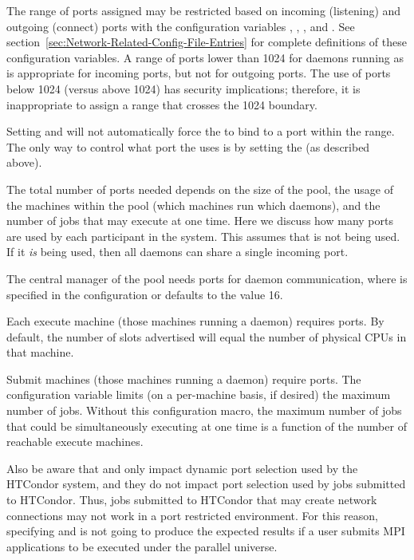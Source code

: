 The range of ports assigned may be restricted based on 
incoming (listening) and outgoing (connect) ports
with the configuration variables
,
,
, and
.
See section~\ref{sec:Network-Related-Config-File-Entries}
for complete definitions of these configuration variables.
A range of ports lower than 1024 for daemons
running as  is appropriate for incoming ports,
but not for outgoing ports.
The use of ports below 1024 (versus above 1024)
has security implications; 
therefore, it is inappropriate to assign a range that crosses
the 1024 boundary.


\Note Setting  and  will not
automatically force the  to bind to a port within
the range.
The only way to control what port the  uses is by
setting the  (as described above).

The total number of ports needed depends on the size of the pool,
the usage of the machines within the pool (which machines
run which daemons),
and the number of jobs that may execute at one time.
Here we discuss how many ports are used by each
participant in the system.  This assumes that 
is not being used.  If it \emph{is} being used, then all daemons
can share a single incoming port.

The central manager of the pool needs
ports for daemon communication,
where 
is specified in the
configuration or defaults to the value 16.

Each execute machine (those machines running a  daemon)
requires
ports.
By default, the number of slots advertised
will equal the number of physical CPUs in that machine.

Submit machines (those machines running a  daemon)
require
 ports.
The configuration variable 
limits (on a per-machine basis, if desired)
the maximum number of jobs.
Without this configuration macro,
the maximum number of jobs that could be simultaneously
executing at one time
is a function of the number of reachable execute machines. 

Also be aware that  and 
only impact dynamic port selection used by the HTCondor system,
and they do not impact port selection used by jobs submitted to HTCondor.
Thus, jobs submitted to HTCondor that may create
network connections may not work in a port restricted environment.
For this reason, specifying  and 
is not going to produce the
expected results if a user submits MPI applications to be executed under
the parallel universe.

